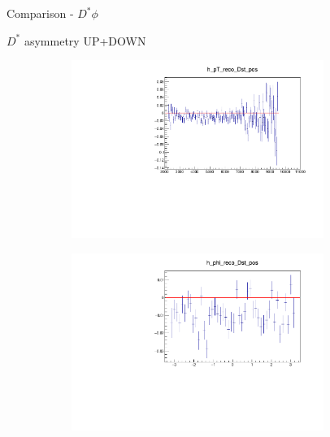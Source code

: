 \documentclass[11pt]{beamer}
\begin{document}
\begin{frame}{Comparison - $D^* \phi$}
\begin{figure}
\end{figure}
\begin{itemize}
\end{itemize}
\end{frame}
\begin{frame}{$D^*$ asymmetry UP+DOWN}
\begin{figure}
\begin{subfigure}{0.45\textwidth}
\includegraphics[width=0.9\textwidth]{up_plus_down_pdf/pT_4.pdf}
\end{subfigure}
\begin{subfigure}{0.45\textwidth}
\includegraphics[width=0.9\textwidth]{up_plus_down_pdf/phi_4.pdf}

\end{subfigure}
\end{figure}
\end{frame}
\end{document}
